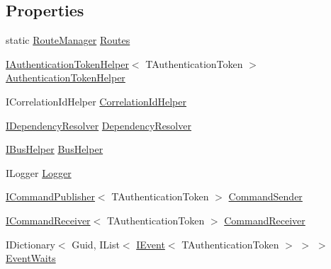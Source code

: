 \subsection*{Properties}
\begin{DoxyCompactItemize}
\item 
static \hyperlink{classCqrs_1_1Bus_1_1RouteManager}{Route\+Manager} \hyperlink{classCqrs_1_1Akka_1_1Commands_1_1AkkaCommandBus_a93ddefb347d0cbc4f869c6d0866c8c64}{Routes}
\item 
\hyperlink{interfaceCqrs_1_1Authentication_1_1IAuthenticationTokenHelper}{I\+Authentication\+Token\+Helper}$<$ T\+Authentication\+Token $>$ \hyperlink{classCqrs_1_1Akka_1_1Commands_1_1AkkaCommandBus_ad74a628484d215ec6daab02b20ac1dbe}{Authentication\+Token\+Helper}
\item 
I\+Correlation\+Id\+Helper \hyperlink{classCqrs_1_1Akka_1_1Commands_1_1AkkaCommandBus_ad8bdf5674c0d5ea3fd9340bd8cd4b0a8}{Correlation\+Id\+Helper}
\item 
\hyperlink{interfaceCqrs_1_1Configuration_1_1IDependencyResolver}{I\+Dependency\+Resolver} \hyperlink{classCqrs_1_1Akka_1_1Commands_1_1AkkaCommandBus_ae1229644077b0740d9014708d15b44c2}{Dependency\+Resolver}
\item 
\hyperlink{interfaceCqrs_1_1Bus_1_1IBusHelper}{I\+Bus\+Helper} \hyperlink{classCqrs_1_1Akka_1_1Commands_1_1AkkaCommandBus_abe5501970c0e39abb9a70670ab985fdc}{Bus\+Helper}
\item 
I\+Logger \hyperlink{classCqrs_1_1Akka_1_1Commands_1_1AkkaCommandBus_a218e431067a4cadbdd711d74cbe8e53b}{Logger}
\item 
\hyperlink{interfaceCqrs_1_1Commands_1_1ICommandPublisher}{I\+Command\+Publisher}$<$ T\+Authentication\+Token $>$ \hyperlink{classCqrs_1_1Akka_1_1Commands_1_1AkkaCommandBus_ae3659627842e6d556320c2d79ab17ebd}{Command\+Sender}
\item 
\hyperlink{interfaceCqrs_1_1Commands_1_1ICommandReceiver}{I\+Command\+Receiver}$<$ T\+Authentication\+Token $>$ \hyperlink{classCqrs_1_1Akka_1_1Commands_1_1AkkaCommandBus_ac65a93dadbbb006dd815c5c54c9ecc82}{Command\+Receiver}
\item 
I\+Dictionary$<$ Guid, I\+List$<$ \hyperlink{interfaceCqrs_1_1Events_1_1IEvent}{I\+Event}$<$ T\+Authentication\+Token $>$ $>$ $>$ \hyperlink{classCqrs_1_1Akka_1_1Commands_1_1AkkaCommandBus_af64744500f25a0b203684ef757aa7962}{Event\+Waits}
\end{DoxyCompactItemize}


